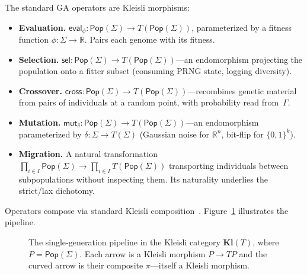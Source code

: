 \documentclass[submission,copyright,creativecommons]{eptcs}
\begin{document}
The standard GA operators are Kleisli morphisms:
\begin{itemize}
\item \textbf{Evaluation.} $\mathsf{eval}_\phi : \mathsf{Pop}(\Sigma) \to
  T(\mathsf{Pop}(\Sigma))$, parameterized by a fitness function
  $\phi : \Sigma \to \mathbb{R}$. Pairs each genome with its fitness.

\item \textbf{Selection.} $\mathsf{sel} : \mathsf{Pop}(\Sigma) \to
  T(\mathsf{Pop}(\Sigma))$---an endomorphism projecting the
  population onto a fitter subset (consuming PRNG state, logging
  diversity).

\item \textbf{Crossover.} $\mathsf{cross} : \mathsf{Pop}(\Sigma) \to
  T(\mathsf{Pop}(\Sigma))$---recombines genetic material from pairs
  of individuals at a random point, with probability read from~$\Gamma$.

\item \textbf{Mutation.} $\mathsf{mut}_\delta : \mathsf{Pop}(\Sigma)
  \to T(\mathsf{Pop}(\Sigma))$---an endomorphism parameterized by
  $\delta : \Sigma \to T(\Sigma)$
  (Gaussian noise for $\mathbb{R}^n$, bit-flip for $\{0,1\}^k$).

\item \textbf{Migration.} A natural transformation
  $\prod_{i \in I} \mathsf{Pop}(\Sigma) \to
  \prod_{i \in I} T(\mathsf{Pop}(\Sigma))$
  transporting individuals between subpopulations without inspecting
  them. Its naturality underlies the strict/lax dichotomy.
\end{itemize}

Operators compose via standard Kleisli composition~\cite{moggi1991notions}.
Figure~\ref{fig:kleisli-pipeline} illustrates the pipeline.

\begin{figure}[t]
\centering
{}
\caption{The single-generation pipeline in the Kleisli category
  $\mathbf{Kl}(T)$, where $P = \mathsf{Pop}(\Sigma)$.  Each arrow is a
  Kleisli morphism $P \to T\!P$ and the curved arrow is their composite
  $\pi$---itself a Kleisli morphism.}
\label{fig:kleisli-pipeline}
\end{figure}
\end{document}

